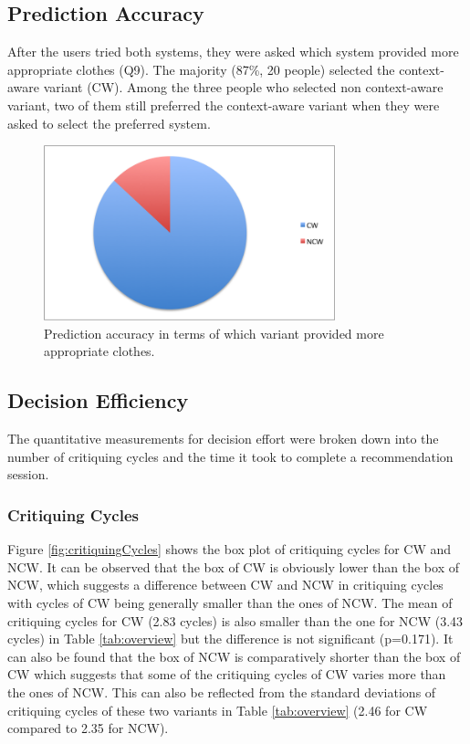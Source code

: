 \subsection{Prediction Accuracy} \label{sec:results_pa}

After the users tried both systems, they were asked which system provided more appropriate clothes (Q9). The majority (87\%, 20 people) selected the context-aware variant (CW). Among the three people who selected non context-aware variant, two of them still preferred the context-aware variant when they were asked to select the preferred system.

\begin{figure}[H]
	\centering
	\includegraphics[height=2in]{figures/predictionAccuracy.png}
	\caption{Prediction accuracy in terms of which variant provided more appropriate clothes.}
	\label{fig:predictionAccuracy}
\end{figure}

\subsection{Decision Efficiency} \label{sec:results_de}

The quantitative measurements for decision effort were broken down into the number of critiquing cycles and the time it took to complete a recommendation session.

\subsubsection{Critiquing Cycles} \label{sec:results_de_cc}

Figure \ref{fig:critiquingCycles} shows the box plot of critiquing cycles for CW and NCW. It can be observed that the box of CW is obviously lower than the box of NCW, which suggests a difference between CW and NCW in critiquing cycles with cycles of CW being generally smaller than the ones of NCW. The mean of critiquing cycles for CW (2.83 cycles) is also smaller than the one for NCW (3.43 cycles) in Table \ref{tab:overview} but the difference is not significant (p=0.171). It can also be found that the box of NCW is comparatively shorter than the box of CW which suggests that some of the critiquing cycles of CW varies more than the ones of NCW. This can also be reflected from the standard deviations of critiquing cycles of these two variants in Table \ref{tab:overview} (2.46 for CW compared to 2.35 for NCW).

